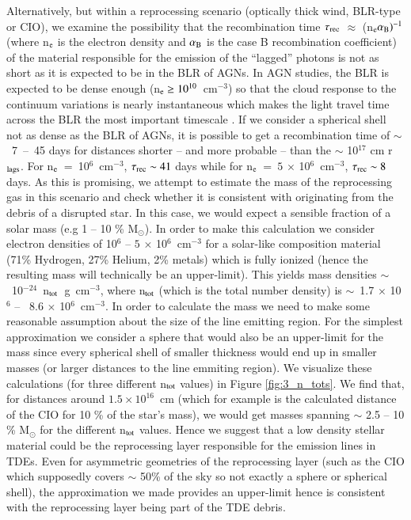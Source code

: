 \documentclass[structabstract]{aa}
\begin{document}
Alternatively, but within a reprocessing scenario (optically thick wind, BLR-type or CIO), we examine the possibility that the recombination time $\tau_{\rm rec}$ $\approx$ (n$_{\rm e}\alpha_{\rm B})^{-1}$ (where n$_{\rm e}$ is the electron density and $\alpha_{\rm B}$ is the case B recombination coefficient) of the material responsible for the emission of the ``lagged'' photons is not as short as it is expected to be in the BLR of AGNs. In AGN studies, the BLR is expected to be dense enough (n$_{\rm e} \geq 10^{10}$~cm$^{-3}$) so that the cloud response to the continuum variations is nearly instantaneous which makes the light travel time across the BLR the most important timescale \citep{Peterson1993}. If we consider a spherical shell not as dense as the BLR of AGNs, it is possible to get a recombination time of $\sim$~7~--~45 days for distances shorter -- and more probable -- than the $\sim$ 10$^{17}$ cm r$_{\rm lags}$. For n$_{\rm e}$~=~10$^{6}$~cm$^{-3}$, $\tau_{\rm rec} \sim 41$ days while for n$_{\rm e}$~=~$5\,\times\,$10$^{6}$~cm$^{-3}$, $\tau_{\rm rec} \sim 8$ days. 
As this is promising, we attempt to estimate the mass of the reprocessing gas in this scenario and check whether it is consistent with originating from the debris of a disrupted star. In this case, we would expect a sensible fraction of a solar mass (e.g 1 -- 10 \% M$_{\odot}$). 
In order to make this calculation we consider electron densities of 10$^{6}$ -- $5\,\times\,$10$^{6}$~cm$^{-3}$ for a solar-like composition material (71\% Hydrogen, 27\% Helium, 2\% metals) which is fully ionized (hence the resulting mass will technically be an upper-limit). This yields mass densities $\sim$~10$^{-24}$~n$_{\rm tot}$~g~cm$^{-3}$, where n$_{\rm tot}$ (which is the total number density) is $\sim$~1.7$\,\times\,$10$^{6}$ --~ 8.6$\,\times\,$10$^{6}$~cm$^{-3}$. In order to calculate the mass we need to make some reasonable assumption about the size of the line emitting region. For the simplest approximation we consider a sphere that would also be an upper-limit for the mass since every spherical shell of smaller thickness would end up in smaller masses (or larger distances to the line emmiting region). We visualize these calculations (for three different n$_{\rm tot}$ values) in Figure \ref{fig:3_n_tots}. We find that, for distances around $1.5 \times 10^{16}$~cm (which for example is the calculated distance of the CIO for 10 \% of the star's mass), we would get masses spanning $\sim$ 2.5 -- 10 \% M$_{\odot}$ for the different n$_{\rm tot}$ values. Hence we suggest that a low density stellar material could be the reprocessing layer responsible for the emission lines in TDEs. Even for asymmetric geometries of the reprocessing layer (such as the CIO which supposedly covers $\sim$ 50\% of the sky so not exactly a sphere or spherical shell), the approximation we made provides an upper-limit hence is consistent with the reprocessing layer being part of the TDE debris.
\end{document}
